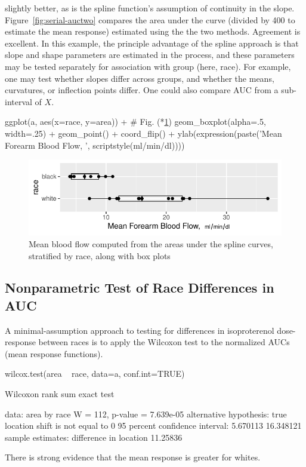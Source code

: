 slightly better, as is the spline function's assumption of continuity in the
slope.  Figure~\ref{fig:serial-auctwo} compares the area under the curve (divided
by 400 to estimate the mean response) estimated using the the two methods.
Agreement is excellent.  In this example, the principle advantage of the spline
approach is that slope and shape parameters are estimated in the process, and
these parameters may be tested separately for association with group (here,
race).  For example, one may test whether slopes differ across groups, and
whether the means, curvatures, or inflection points differ.  One could
also compare AUC from a sub-interval of $X$.
\begin{Schunk}
\begin{Sinput}
ggplot(a, aes(x=race, y=area)) +    # Fig. (*\ref{fig:serial-auc}\ipacue*)
  geom_boxplot(alpha=.5, width=.25) + geom_point() + coord_flip() +
  ylab(expression(paste('Mean Forearm Blood Flow,  ', scriptstyle(ml/min/dl))))
\end{Sinput}
\begin{figure}[htbp]

\centerline{\includegraphics[width=\maxwidth]{serial-auc-1} }

\caption[Mean blood flow by race]{Mean blood flow computed from the areas under the spline curves, stratified by race, along with box plots}\label{fig:serial-auc}
\end{figure}
\end{Schunk}

\subsection{Nonparametric Test of Race Differences in AUC}\ipacue
A minimal-assumption approach to testing for differences in
isoproterenol dose-response between races is to apply the Wilcoxon
test to the normalized AUCs (mean response functions).
\begin{Schunk}
\begin{Sinput}
wilcox.test(area ~ race, data=a, conf.int=TRUE)
\end{Sinput}
\begin{Soutput}

	Wilcoxon rank sum exact test

data:  area by race
W = 112, p-value = 7.639e-05
alternative hypothesis: true location shift is not equal to 0
95 percent confidence interval:
  5.670113 16.348121
sample estimates:
difference in location 
              11.25836 
\end{Soutput}
\end{Schunk}
There is strong evidence that the mean response is greater for whites.

